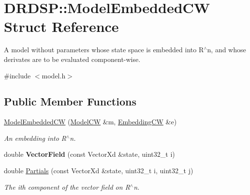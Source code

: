 \hypertarget{struct_d_r_d_s_p_1_1_model_embedded_c_w}{\section{D\-R\-D\-S\-P\-:\-:Model\-Embedded\-C\-W Struct Reference}
\label{struct_d_r_d_s_p_1_1_model_embedded_c_w}
}


A model without parameters whose state space is embedded into R$^\wedge$n, and whose derivates are to be evaluated component-\/wise.  




{\ttfamily \#include $<$model.\-h$>$}

\subsection*{Public Member Functions}
\begin{DoxyCompactItemize}
\item 
\hypertarget{struct_d_r_d_s_p_1_1_model_embedded_c_w_aa4d612f6d5c9060c38c99008b04b10dd}{\hyperlink{struct_d_r_d_s_p_1_1_model_embedded_c_w_aa4d612f6d5c9060c38c99008b04b10dd}{Model\-Embedded\-C\-W} (\hyperlink{struct_d_r_d_s_p_1_1_model_c_w}{Model\-C\-W} \&m, \hyperlink{struct_d_r_d_s_p_1_1_embedding_c_w}{Embedding\-C\-W} \&e)}\label{struct_d_r_d_s_p_1_1_model_embedded_c_w_aa4d612f6d5c9060c38c99008b04b10dd}

\begin{DoxyCompactList}\small\item\em An embedding into R$^\wedge$n. \end{DoxyCompactList}\item 
\hypertarget{struct_d_r_d_s_p_1_1_model_embedded_c_w_a0d7f5f41f6211498d63de4e882b12dea}{double {\bfseries Vector\-Field} (const Vector\-Xd \&state, uint32\-\_\-t i)}\label{struct_d_r_d_s_p_1_1_model_embedded_c_w_a0d7f5f41f6211498d63de4e882b12dea}

\item 
\hypertarget{struct_d_r_d_s_p_1_1_model_embedded_c_w_a6d82aae83ad411ddf8459aeeebc93d14}{double \hyperlink{struct_d_r_d_s_p_1_1_model_embedded_c_w_a6d82aae83ad411ddf8459aeeebc93d14}{Partials} (const Vector\-Xd \&state, uint32\-\_\-t i, uint32\-\_\-t j)}\label{struct_d_r_d_s_p_1_1_model_embedded_c_w_a6d82aae83ad411ddf8459aeeebc93d14}

\begin{DoxyCompactList}\small\item\em The ith component of the vector field on R$^\wedge$n. \end{DoxyCompactList}\end{DoxyCompactItemize}
